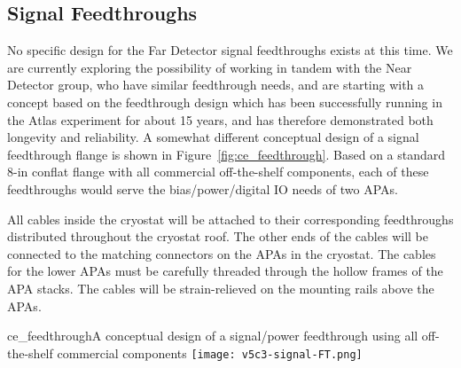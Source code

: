 %
\subsection{Signal Feedthroughs }
\label{subsec:ce_feedthroughs}

No specific design for the Far Detector signal feedthroughs exists at this time.
We are currently exploring the possibility of working in tandem with the Near Detector group, who have
similar feedthrough needs, and are starting with a concept based on the feedthrough design which has been successfully
running in the Atlas experiment for about 15 years, and has therefore demonstrated both longevity and reliability.
A somewhat different conceptual design of a signal feedthrough flange is shown in Figure~\ref{fig:ce_feedthrough}.
Based on a standard 8-in conflat flange with all commercial off-the-shelf components,
each of these feedthroughs would serve the bias/power/digital IO needs of two APAs.  

All cables inside the cryostat will be attached to their corresponding feedthroughs distributed throughout the cryostat roof.
The other ends of the cables will be connected to the matching connectors on the APAs in the cryostat.
The cables for the lower APAs must be carefully threaded through the hollow frames of the APA stacks.
The cables will be strain-relieved on the  mounting rails above the APAs. 


\begin{cdrfigure}{ce_feedthrough}{A conceptual design of a signal/power feedthrough using all off-the-shelf commercial components}
\texttt{[image: v5c3-signal-FT.png]}
\end{cdrfigure}

